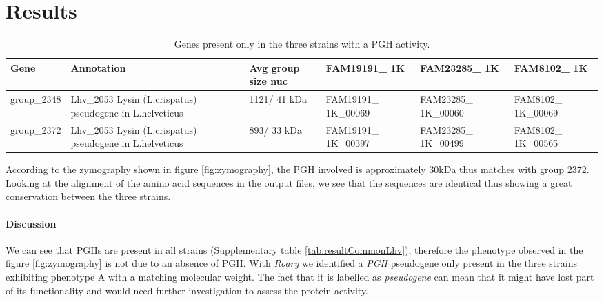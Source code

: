 \documentclass[10pt,a4paper]{article}
\begin{document}
\section*{Results}


\begin{table}[htbp]
	\centering
	\begin{tabularx}{\linewidth}{|X|X|X|X|X|X|}
		\hline
		\textbf{Gene} & \textbf{Annotation} & \textbf{Avg group size nuc} & \textbf{FAM19191\_ 1K} & \textbf{FAM23285\_ 1K} & \textbf{FAM8102\_ 1K}\\
		 \hline
		group\_2348 & Lhv\_2053 Lysin (L.crispatus) pseudogene in L.helveticus & 1121/ 41 kDa & FAM19191\_ 1K\_00069 & FAM23285\_ 1K\_00060 & FAM8102\_ 1K\_00069 \\
		\hline
		group\_2372 & Lhv\_2053 Lysin (L.crispatus) pseudogene in L.helveticus & 893/ 33 kDa & FAM19191\_ 1K\_00397 & FAM23285\_ 1K\_00499 & FAM8102\_ 1K\_00565 \\
		\hline	
	\end{tabularx}
	\caption{Genes present only in the three strains with a PGH activity.}
	\label{tab:resultPGHexpr}
\end{table}

\noindent According to the zymography shown in figure \ref{fig:zymography}, the PGH involved is approximately 30kDa thus matches with group 2372. Looking at the alignment of the amino acid sequences in the output files,
we see that the sequences are identical thus showing a great conservation between the three strains. \\












\paragraph{Discussion} We can see that PGHs are present in all strains (Supplementary table \ref{tab:resultCommonLhv}), therefore the phenotype observed in the figure \ref{fig:zymography} is not due to an absence of PGH. With \textit{Roary} we identified a \textit{PGH} pseudogene only present in the three strains exhibiting phenotype A with a matching molecular weight. The fact that it is labelled as \textit{pseudogene} can mean that it might have lost part of its functionality and would need further investigation to assess the protein activity.\\
\end{document}

